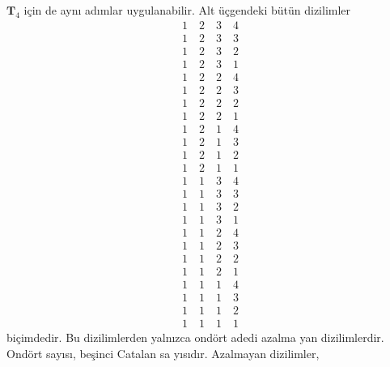 \documentclass[a4paper,10pt]{article}
\begin{document}
$\mathbf{T}_{4}$ i\c{c}in de ayn{\i} ad\i mlar uygulanabilir. Alt%
\"u\c{c}gendeki b\"ut\"un dizilimler %
\begin{eqnarray}
 1\quad 2\quad 3\quad 4\nonumber\\
 1\quad 2\quad 3\quad 3\nonumber\\
 1\quad 2\quad 3\quad 2\nonumber\\
 1\quad 2\quad 3\quad 1\nonumber\\
 1\quad 2\quad 2\quad 4\nonumber\\
 1\quad 2\quad 2\quad 3\nonumber\\
 1\quad 2\quad 2\quad 2\nonumber\\
 1\quad 2\quad 2\quad 1\nonumber\\
 1\quad 2\quad 1\quad 4\nonumber\\
 1\quad 2\quad 1\quad 3\nonumber\\
 1\quad 2\quad 1\quad 2\nonumber\\
 1\quad 2\quad 1\quad 1\nonumber\\
 1\quad 1\quad 3\quad 4\nonumber\\
 1\quad 1\quad 3\quad 3\nonumber\\
 1\quad 1\quad 3\quad 2\nonumber\\
 1\quad 1\quad 3\quad 1\nonumber\\
 1\quad 1\quad 2\quad 4\nonumber\\
 1\quad 1\quad 2\quad 3\nonumber\\
 1\quad 1\quad 2\quad 2\nonumber\\
 1\quad 1\quad 2\quad 1\nonumber\\
 1\quad 1\quad 1\quad 4\nonumber\\
 1\quad 1\quad 1\quad 3\nonumber\\
 1\quad 1\quad 1\quad 2\nonumber\\
 1\quad 1\quad 1\quad 1
\end{eqnarray}
bi\c{c}imdedir. Bu dizilimlerden yaln\i zca ond\"ort adedi azalma%
yan dizilimlerdir. On\-d\"ort say\i s{\i}, be\c{s}inci Catalan sa%
y\i s\i d\i r. Azalmayan dizilimler, %
\end{document}
